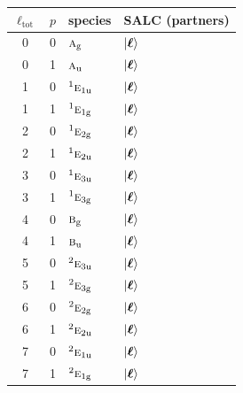\documentclass[11pt]{article}
\newcommand{\irr}[1]{\text{\normalfont\scshape #1}}
\newcommand{\conjpair}[1]{{}^{#1}}
\newcommand{\ptag}[1]{\mathrm{#1}}
\begin{document}
\begin{longtable}{c c l l}\hline $\ell_{\mathrm{tot}}$ & $p$ & species & SALC (partners)\\ \hline\endhead

0 & 0 & $\irr{a}_{\ptag{g}}$ & $\ket{\boldsymbol\ell}$\\

0 & 1 & $\irr{a}_{\ptag{u}}$ & $\ket{\boldsymbol\ell}$\\

1 & 0 & $\conjpair{1}\irr{e}_{1\ptag{u}}$ & $\ket{\boldsymbol\ell}$\\

1 & 1 & $\conjpair{1}\irr{e}_{1\ptag{g}}$ & $\ket{\boldsymbol\ell}$\\

2 & 0 & $\conjpair{1}\irr{e}_{2\ptag{g}}$ & $\ket{\boldsymbol\ell}$\\

2 & 1 & $\conjpair{1}\irr{e}_{2\ptag{u}}$ & $\ket{\boldsymbol\ell}$\\

3 & 0 & $\conjpair{1}\irr{e}_{3\ptag{u}}$ & $\ket{\boldsymbol\ell}$\\

3 & 1 & $\conjpair{1}\irr{e}_{3\ptag{g}}$ & $\ket{\boldsymbol\ell}$\\

4 & 0 & $\irr{b}_{\ptag{g}}$ & $\ket{\boldsymbol\ell}$\\

4 & 1 & $\irr{b}_{\ptag{u}}$ & $\ket{\boldsymbol\ell}$\\

5 & 0 & $\conjpair{2}\irr{e}_{3\ptag{u}}$ & $\ket{\boldsymbol\ell}$\\

5 & 1 & $\conjpair{2}\irr{e}_{3\ptag{g}}$ & $\ket{\boldsymbol\ell}$\\

6 & 0 & $\conjpair{2}\irr{e}_{2\ptag{g}}$ & $\ket{\boldsymbol\ell}$\\

6 & 1 & $\conjpair{2}\irr{e}_{2\ptag{u}}$ & $\ket{\boldsymbol\ell}$\\

7 & 0 & $\conjpair{2}\irr{e}_{1\ptag{u}}$ & $\ket{\boldsymbol\ell}$\\

7 & 1 & $\conjpair{2}\irr{e}_{1\ptag{g}}$ & $\ket{\boldsymbol\ell}$\\

\hline\end{longtable}
\end{document}
